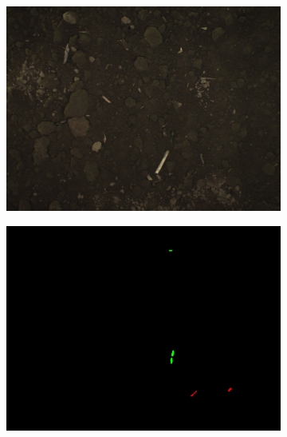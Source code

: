     
    
    \begin{figure}
    \centering
     \begin{subfigure}[b]{0.49\linewidth}
    \includegraphics[width=\linewidth]{pics/bonn/images/bonirob_2016-04-28-12-20-29_6_frame217.png}
   		\caption{}
		\label{bonn_img}    		
   \end{subfigure}
        \begin{subfigure}[b]{0.49\linewidth}
    \includegraphics[width=\linewidth]{pics/bonn/annotations/bonirob_2016-04-28-12-20-29_6_frame217.png}
   		\caption{}
		\label{bonn_lbl}    		
   \end{subfigure}
        \begin{subfigure}[b]{0.49\linewidth}

\end{subfigure}
\end{figure}
